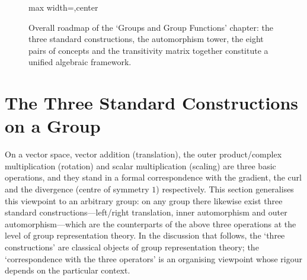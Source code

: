\begin{figure}[htbp]
\centering
\begin{adjustbox}{max width=\linewidth,center}
\end{adjustbox}\par
\caption{Overall roadmap of the `Groups and Group Functions' chapter: the three standard constructions, the automorphism tower, the eight pairs of concepts and the transitivity matrix together constitute a unified algebraic framework.}
\label{fig:group_function_overview}
\end{figure}

\section{\texorpdfstring{The Three Standard Constructions on a Group}{The Three Standard Constructions on a Group}}

On a vector space, vector addition (translation), the outer product/complex multiplication (rotation) and scalar multiplication (scaling) are three basic operations, and they stand in a formal correspondence with the gradient, the curl and the divergence (centre of symmetry $1$) respectively. This section generalises this viewpoint to an arbitrary group: on any group there likewise exist three standard constructions---left/right translation, inner automorphism and outer automorphism---which are the counterparts of the above three operations at the level of group representation theory. In the discussion that follows, the `three constructions' are classical objects of group representation theory; the `correspondence with the three operators' is an organising viewpoint whose rigour depends on the particular context.

